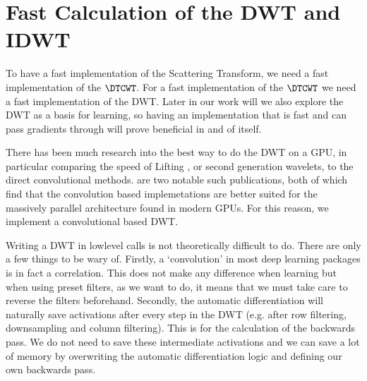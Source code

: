 
\section{Fast Calculation of the DWT and IDWT}\label{sec:ch3:dwt}
\begin{figure}
  \centering
  
  \label{fig:ch3:dwt}
\end{figure}

To have a fast implementation of the Scattering Transform, we need a fast
implementation of the $\DTCWT$. For a fast implementation of the $\DTCWT$ we
need a fast implementation of the DWT. Later in our work will we also explore
the DWT as a basis for learning, so having an implementation that is fast and
can pass gradients through will prove beneficial in and of itself.

There has been much research into the best way to do the DWT on a GPU, in
particular comparing the speed of Lifting \cite{sweldens_lifting_1998}, or second
generation wavelets, to the direct convolutional methods.
\cite{tenllado_parallel_2008, galiano_improving_2011} are two notable such
publications, both of which find that the convolution based implemetations are
better suited for the massively parallel architecture found in modern GPUs. For
this reason, we implement a convolutional based DWT.

Writing a DWT in lowlevel calls is not theoretically difficult to do.
There are only a few things to be wary of. Firstly, a `convolution' in most deep
learning packages is in fact a correlation. This does not make any difference
when learning but when using preset filters, as we want to do, it means that we
must take care to reverse the filters beforehand. Secondly, the automatic 
differentiation will naturally save activations after every step in the DWT
(e.g. after row filtering, downsampling and column filtering). This is for the
calculation of the backwards pass. We do not need to save these intermediate
activations and we can save a lot of memory by overwriting the automatic
differentiation logic and defining our own backwards pass.

